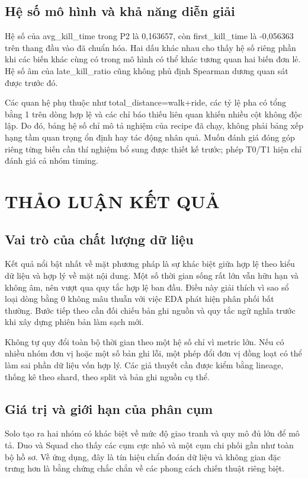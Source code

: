 \documentclass[12pt,a4paper]{article}
\begin{document}
\subsection{Hệ số mô hình và khả năng diễn giải}

Hệ số của avg\_kill\_time trong P2 là 0,163657, còn first\_kill\_time là -0,056363 trên thang đầu vào đã chuẩn hóa. Hai dấu khác nhau cho thấy hệ số riêng phần khi các biến khác cùng có trong mô hình có thể khác tương quan hai biến đơn lẻ. Hệ số âm của late\_kill\_ratio cũng không phủ định Spearman dương quan sát được trước đó.

Các quan hệ phụ thuộc như total\_distance=walk+ride, các tỷ lệ pha có tổng bằng 1 trên dòng hợp lệ và các chỉ báo thiếu liên quan khiến nhiều cột không độc lập. Do đó, bảng hệ số chỉ mô tả nghiệm của recipe đã chạy, không phải bảng xếp hạng tầm quan trọng ổn định hay tác động nhân quả. Muốn đánh giá đóng góp riêng từng biến cần thí nghiệm bổ sung được thiết kế trước; phép T0/T1 hiện chỉ đánh giá cả nhóm timing.
\clearpage
\section{THẢO LUẬN KẾT QUẢ}
\subsection{Vai trò của chất lượng dữ liệu}
Kết quả nổi bật nhất về mặt phương pháp là sự khác biệt giữa hợp lệ theo kiểu dữ liệu và hợp lý về mặt nội dung. Một số thời gian sống rất lớn vẫn hữu hạn và không âm, nên vượt qua quy tắc hợp lệ ban đầu. Điều này giải thích vì sao sổ loại dòng bằng 0 không mâu thuẫn với việc EDA phát hiện phân phối bất thường. Bước tiếp theo cần đối chiếu bản ghi nguồn và quy tắc ngữ nghĩa trước khi xây dựng phiên bản làm sạch mới.

Không tự quy đổi toàn bộ thời gian theo một hệ số chỉ vì metric lớn. Nếu có nhiều nhóm đơn vị hoặc một số bản ghi lỗi, một phép đổi đơn vị đồng loạt có thể làm sai phần dữ liệu vốn hợp lý. Các giả thuyết cần được kiểm bằng lineage, thống kê theo shard, theo split và bản ghi nguồn cụ thể.
\subsection{Giá trị và giới hạn của phân cụm}
Solo tạo ra hai nhóm có khác biệt về mức độ giao tranh và quy mô đủ lớn để mô tả. Duo và Squad cho thấy các cụm cực nhỏ và một cụm chi phối gần như toàn bộ hồ sơ. Về ứng dụng, đây là tín hiệu chẩn đoán dữ liệu và không gian đặc trưng hơn là bằng chứng chắc chắn về các phong cách chiến thuật riêng biệt.
\end{document}
